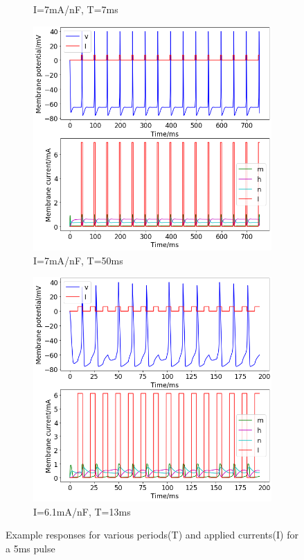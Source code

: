 \documentclass[twoside,twocolumn]{article}
\begin{document}
\begin{figure}[h]
\begin{subfigure}[t]{0.49\textwidth}
  \caption{I=7mA/nF, T=7ms}
  \label{sub:2b7-7}
  \end{subfigure}
\newline
\begin{subfigure}[t]{0.49\textwidth}
    \includegraphics[width=\linewidth]{7-50}
  \caption{I=7mA/nF, T=50ms}
  \label{sub:2b7-50}
  \end{subfigure}
  \begin{subfigure}[t]{0.49\textwidth}
    \includegraphics[width=\linewidth]{61-13}
  \caption{I=6.1mA/nF, T=13ms}
  \label{sub:2b61-13}
  \end{subfigure}
  \caption{Example responses for various periods(T) and applied currents(I) for a 5ms pulse}
  \label{fig:2be}
\end{figure}
\twocolumn
\end{document}
